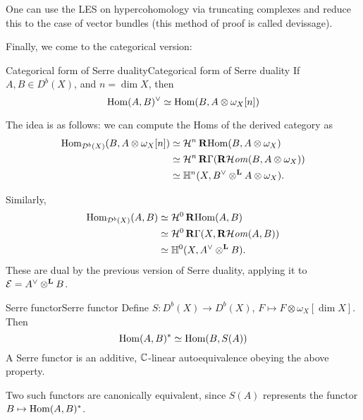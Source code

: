 One can use the LES on hypercohomology via truncating complexes and reduce this to the case of vector bundles (this method of proof is called devissage).

Finally, we come to the categorical version:

\begin{proposition}{Categorical form of Serre duality}{Categorical form of Serre duality}
    If $A,B\in D^b(X)$, and $n=\dim X$, then
    \begin{equation*}
        \operatorname{Hom}(A,B)^\vee \simeq \operatorname{Hom}(B,A\otimes\omega_X[n])
    \end{equation*}
\end{proposition}

The idea is as follows: we can compute the Homs of the derived category as
\begin{align*}
    \operatorname{Hom}_{\mathcal{D}^b(X)}(B,A\otimes\omega_X[n])
        &\simeq \mathcal{H}^n\operatorname{\mathbf{R} Hom}(B,A\otimes\omega_X) \\
        &\simeq \mathcal{H}^n\operatorname{\mathbf{R}\Gamma}(\operatorname{\mathbf{R}\mathcal{H}\mathit{om}}(B,A\otimes\omega_X)) \\
        &\simeq \mathbb{H}^n(X,B^\vee\otimes^{\mathbf{L}} A\otimes\omega_X).
\end{align*}

Similarly,
\begin{align*}
    \operatorname{Hom}_{\mathcal{D}^b(X)}(A,B)
        &\simeq \mathcal{H}^0\operatorname{\mathbf{R} Hom}(A,B) \\
        &\simeq \mathcal{H}^0\operatorname{\mathbf{R}\Gamma}(X,\operatorname{\mathbf{R}\mathcal{H}\mathit{om}}(A,B)) \\
        &\simeq \mathbb{H}^0(X,A^\vee\otimes^{\mathbf{L}} B).
\end{align*}
These are dual by the previous version of Serre duality, applying it to $\mathcal{E}=A^\vee\otimes^{\mathbf{L}} B$.

\begin{definition}{Serre functor}{Serre functor}
    Define $S:D^b(X)\to D^b(X)$, $F\mapsto F\otimes\omega_X[\dim X]$. Then
    \begin{equation*}
        \operatorname{Hom}(A,B)^*\simeq\operatorname{Hom}(B,S(A))
    \end{equation*}
     A Serre functor is an additive, $\mathbb{C}$-linear autoequivalence obeying the above property. 
\end{definition}

Two such functors are canonically equivalent, since $S(A)$ represents the functor $B\mapsto\operatorname{Hom}(A,B)^*$.


